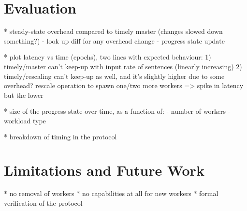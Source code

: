 \documentclass[12pt]{extarticle}
\begin{document}
\section{Evaluation}

* steady-state overhead compared to timely master (changes slowed down something?)
   - look up diff for any overhead change
   - progress state update

* plot latency vs time (epochs), two lines with expected behaviour:
    1) timely/master can't keep-up with input rate of sentences (linearly increasing)
    2) timely/rescaling can't keep-up as well, and it's slightly higher due to some overhead?
       rescale operation to spawn one/two more workers => spike in latency but the lower

* size of the progress state over time, as a function of:
  - number of workers
  - workload type

* breakdown of timing in the protocol

\section{Limitations and Future Work}

* no removal of workers
* no capabilities at all for new workers
* formal verification of the protocol
\end{document}
